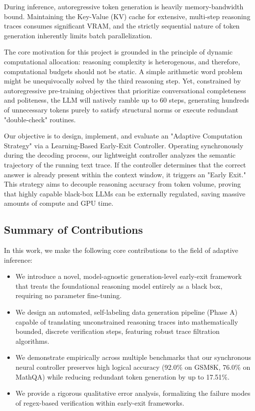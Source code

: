 \documentclass[11pt]{article}
\begin{document}
During inference, autoregressive token generation is heavily memory-bandwidth bound. Maintaining the Key-Value (KV) cache for extensive, multi-step reasoning traces consumes significant VRAM, and the strictly sequential nature of token generation inherently limits batch parallelization. 

The core motivation for this project is grounded in the principle of dynamic computational allocation: reasoning complexity is heterogenous, and therefore, computational budgets should not be static. A simple arithmetic word problem might be unequivocally solved by the third reasoning step. Yet, constrained by autoregressive pre-training objectives that prioritize conversational completeness and politeness, the LLM will natively ramble up to 60 steps, generating hundreds of unnecessary tokens purely to satisfy structural norms or execute redundant "double-check" routines.

Our objective is to design, implement, and evaluate an "Adaptive Computation Strategy" via a Learning-Based Early-Exit Controller. Operating synchronously during the decoding process, our lightweight controller analyzes the semantic trajectory of the running text trace. If the controller determines that the correct answer is already present within the context window, it triggers an "Early Exit." This strategy aims to decouple reasoning accuracy from token volume, proving that highly capable black-box LLMs can be externally regulated, saving massive amounts of compute and GPU time.

\subsection{Summary of Contributions}
In this work, we make the following core contributions to the field of adaptive inference:
\begin{itemize}[leftmargin=*]
    \item We introduce a novel, model-agnostic generation-level early-exit framework that treats the foundational reasoning model entirely as a black box, requiring no parameter fine-tuning.
    \item We design an automated, self-labeling data generation pipeline (Phase A) capable of translating unconstrained reasoning traces into mathematically bounded, discrete verification steps, featuring robust trace filtration algorithms.
    \item We demonstrate empirically across multiple benchmarks that our synchronous neural controller preserves high logical accuracy (92.0\% on GSM8K, 76.0\% on MathQA) while reducing redundant token generation by up to 17.51\%.
    \item We provide a rigorous qualitative error analysis, formalizing the failure modes of regex-based verification within early-exit frameworks.
\end{itemize}
\end{document}
